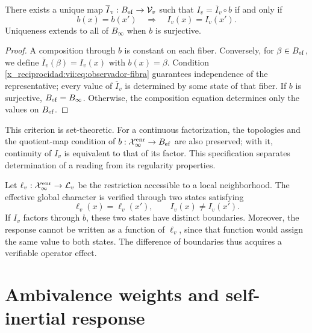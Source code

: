 \begin{theorem}
\label{x_reciprocidad:vii:thm:observador-factorizacion}
There exists a unique map \(\overline I_v:B_{\rm ef}\to\mathcal V_v\)
such that \(I_v=\overline I_v\circ b\) if and only if
\begin{equation}
 b(x)=b(x')\quad\Longrightarrow\quad I_v(x)=I_v(x').
 \label{x_reciprocidad:vii:eq:observador-fibra}
\end{equation}
Uniqueness extends to all of \(B_\infty\) when \(b\) is
surjective.
\end{theorem}

\begin{proof}
A composition through \(b\) is constant on each fiber. Conversely,
for \(\beta\in B_{\rm ef}\), we define
\(\overline I_v(\beta)=I_v(x)\) with \(b(x)=\beta\).
Condition \eqref{x_reciprocidad:vii:eq:observador-fibra} guarantees independence
of the representative; every value of \(\overline I_v\) is determined
by some state of that fiber. If \(b\) is surjective,
\(B_{\rm ef}=B_\infty\). Otherwise, the composition equation
determines only the values on \(B_{\rm ef}\).
\end{proof}

This criterion is set-theoretic. For a continuous factorization, the
topologies and the quotient-map condition
of \(b:\mathcal X_\infty^{\rm enr}\to B_{\rm ef}\) are also preserved; with it,
continuity of \(I_v\) is equivalent to that of its factor. This specification
separates determination of a reading from its regularity properties.

Let \(\ell_v:\mathcal X_\infty^{\rm enr}\to\mathcal L_v\) be the
restriction accessible to a local neighborhood. The effective global character
is verified through two states satisfying
\begin{equation}
 \ell_v(x)=\ell_v(x'),\qquad I_v(x)\neq I_v(x').
 \label{x_reciprocidad:vii:eq:observador-testigo-global}
\end{equation}
If \(I_v\) factors through \(b\), these two states have distinct
boundaries. Moreover, the response cannot be written as a function of
\(\ell_v\), since that function would assign the same value to both states.
The difference of boundaries thus acquires a verifiable operator effect.

\section{Ambivalence weights and self-inertial response}
\label{x_reciprocidad:vii:sec:observador-ambivalencia}

